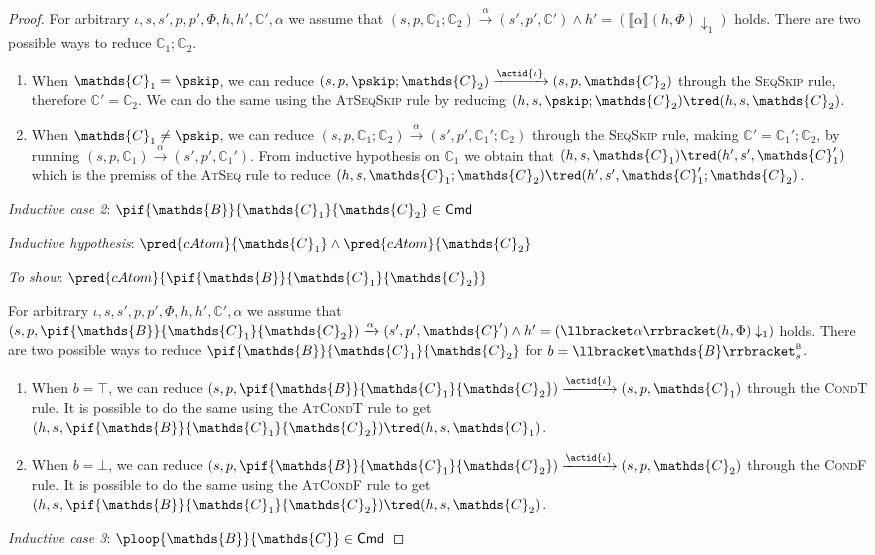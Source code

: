 \begin{lem}
{\begin{proof}
	For arbitrary $\iota, s, s', p, p', \Phi, h, h', \mathds{C}', \alpha$ we assume that $(s, p, \mathds{C}_1 ; \mathds{C}_2) \xrightarrow{\alpha} (s', p', \mathds{C}') \land h' = \left( \llbracket \alpha \rrbracket(h, \Phi) \downarrow_1 \right)$ holds. There are two possible ways to reduce $\mathds{C}_1 ; \mathds{C}_2$.
	\begin{enumerate}
	\item When $\mathds{C}_1 = \pskip$, we can reduce $(s, p, \pskip ; \mathds{C}_2) \xrightarrow{\actid{\iota}} (s, p, \mathds{C}_2)$ through the \textsc{SeqSkip} rule, therefore $\mathds{C}' = \mathds{C}_2$. We can do the same using the \textsc{AtSeqSkip} rule by reducing $(h, s, \pskip ; \mathds{C}_2) \tred (h, s, \mathds{C}_2)$.
	\item When $\mathds{C}_1 \neq \pskip$, we can reduce $(s, p, \mathds{C}_1 ; \mathds{C}_2) \xrightarrow{\alpha} (s', p', \mathds{C}_1' ; \mathds{C}_2)$ through the \textsc{SeqSkip} rule, making $\mathds{C}' = \mathds{C}_1'; \mathds{C}_2$, by running $(s, p, \mathds{C}_1) \xrightarrow{\alpha} (s', p', \mathds{C}_1')$. From inductive hypothesis on $\mathds{C}_1$ we obtain that $(h, s, \mathds{C}_1) \tred (h', s', \mathds{C}_1')$ which is the premiss of the \textsc{AtSeq} rule to reduce $(h, s, \mathds{C}_1 ; \mathds{C}_2) \tred (h', s', \mathds{C}_1' ; \mathds{C}_2)$. \\
	\end{enumerate}
	\indline
	\textit{Inductive case 2}: $\pif{\mathds{B}}{\mathds{C}_1}{\mathds{C}_2} \in \mathsf{Cmd}$
	
	\textit{Inductive hypothesis}: $\pred{cAtom}{\mathds{C}_1} \land \pred{cAtom}{\mathds{C}_2}$
	
	\textit{To show}: $\pred{cAtom}{\pif{\mathds{B}}{\mathds{C}_1}{\mathds{C}_2}}$
	
	For arbitrary $\iota, s, s', p, p', \Phi, h, h', \mathds{C}', \alpha$ we assume that $(s, p, \pif{\mathds{B}}{\mathds{C}_1}{\mathds{C}_2}) \xrightarrow{\alpha} (s', p', \mathds{C}') \land h' = \left( \llbracket \alpha \rrbracket(h, \Phi) \downarrow_1 \right)$ holds. There are two possible ways to reduce $\pif{\mathds{B}}{\mathds{C}_1}{\mathds{C}_2}$ for $b = \llbracket \mathds{B} \rrbracket_{s}^{\textsc{b}}$.
	\begin{enumerate}
	\item When $b = \top$, we can reduce $(s, p, \pif{\mathds{B}}{\mathds{C}_1}{\mathds{C}_2}) \xrightarrow{\actid{\iota}} (s, p, \mathds{C}_1)$ through the \textsc{CondT} rule. It is possible to do the same using the \textsc{AtCondT} rule to get $(h, s, \pif{\mathds{B}}{\mathds{C}_1}{\mathds{C}_2}) \tred (h, s, \mathds{C}_1)$.
	\item When $b = \bot$, we can reduce $(s, p, \pif{\mathds{B}}{\mathds{C}_1}{\mathds{C}_2}) \xrightarrow{\actid{\iota}} (s, p, \mathds{C}_2)$ through the \textsc{CondF} rule. It is possible to do the same using the \textsc{AtCondF} rule to get $(h, s, \pif{\mathds{B}}{\mathds{C}_1}{\mathds{C}_2}) \tred (h, s, \mathds{C}_2)$.
	\end{enumerate}
	\indline
	\textit{Inductive case 3}: $\ploop{\mathds{B}}{\mathds{C}} \in \mathsf{Cmd}$
	

\end{proof}}
\end{lem}
